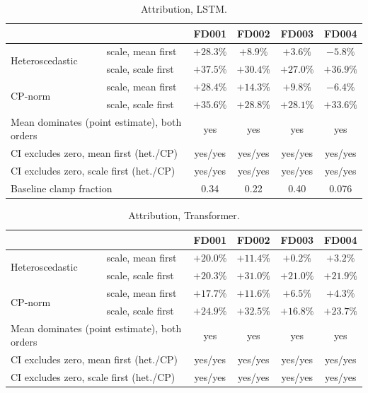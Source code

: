 \documentclass[10pt,a4paper]{article}
\begin{document}
\begin{table}[H]\centering\footnotesize
\caption{Attribution, LSTM.}\begin{tabular}{llcccc}\toprule & & FD001 & FD002 & FD003 & FD004 \\ \midrule
\multirow{2}{*}{Heteroscedastic} & scale, mean first & $+28.3\%$ & $+8.9\%$ & $+3.6\%$ & $-5.8\%$ \\
 & scale, scale first & $+37.5\%$ & $+30.4\%$ & $+27.0\%$ & $+36.9\%$ \\
\multirow{2}{*}{CP-norm} & scale, mean first & $+28.4\%$ & $+14.3\%$ & $+9.8\%$ & $-6.4\%$ \\
 & scale, scale first & $+35.6\%$ & $+28.8\%$ & $+28.1\%$ & $+33.6\%$ \\
\midrule
\multicolumn{2}{l}{Mean dominates (point estimate), both orders} & yes & yes & yes & yes \\
\multicolumn{2}{l}{CI excludes zero, mean first (het./CP)} & yes/yes & yes/yes & yes/yes & yes/yes \\
\multicolumn{2}{l}{CI excludes zero, scale first (het./CP)} & yes/yes & yes/yes & yes/yes & yes/yes \\
\multicolumn{2}{l}{Baseline clamp fraction} & 0.34 & 0.22 & 0.40 & 0.076 \\
\bottomrule\end{tabular}
\end{table}
\begin{table}[H]\centering\footnotesize
\caption{Attribution, Transformer.}\begin{tabular}{llcccc}\toprule & & FD001 & FD002 & FD003 & FD004 \\ \midrule
\multirow{2}{*}{Heteroscedastic} & scale, mean first & $+20.0\%$ & $+11.4\%$ & $+0.2\%$ & $+3.2\%$ \\
 & scale, scale first & $+20.3\%$ & $+31.0\%$ & $+21.0\%$ & $+21.9\%$ \\
\multirow{2}{*}{CP-norm} & scale, mean first & $+17.7\%$ & $+11.6\%$ & $+6.5\%$ & $+4.3\%$ \\
 & scale, scale first & $+24.9\%$ & $+32.5\%$ & $+16.8\%$ & $+23.7\%$ \\
\midrule
\multicolumn{2}{l}{Mean dominates (point estimate), both orders} & yes & yes & yes & yes \\
\multicolumn{2}{l}{CI excludes zero, mean first (het./CP)} & yes/yes & yes/yes & yes/yes & yes/yes \\
\multicolumn{2}{l}{CI excludes zero, scale first (het./CP)} & yes/yes & yes/yes & yes/yes & yes/yes \\
\bottomrule\end{tabular}
\end{table}
\end{document}
